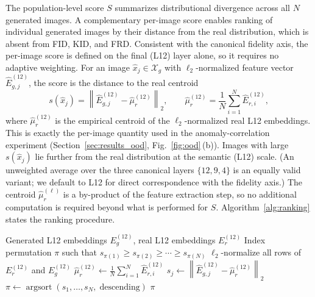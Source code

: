 \documentclass[lettersize,journal]{IEEEtran}
\begin{document}
The population-level score $S$ summarizes distributional divergence
across all $N$ generated images.
A complementary per-image score enables ranking of individual generated
images by their distance from the real distribution, which is absent from
FID, KID, and FRD.
Consistent with the canonical fidelity axis, the per-image score is defined on
the final (L12) layer alone, so it requires no adaptive weighting. For an image
$\hat{x}_j \in \mathcal{X}_g$ with $\ell_2$-normalized feature vector
$\hat{E}_{g,j}^{(12)}$, the score is the distance to the real centroid
\begin{equation}
\label{eq:perim}
s(\hat{x}_j)
=
\left\|
\hat{E}_{g,j}^{(12)} - \hat{\mu}_{r}^{(12)}
\right\|_2,
\qquad
\hat{\mu}_{r}^{(12)}
=
\frac{1}{N}
\sum_{i=1}^{N}
\hat{E}_{r,i}^{(12)},
\end{equation}
where $\hat{\mu}_{r}^{(12)}$ is the empirical centroid of the
$\ell_2$-normalized real L12 embeddings. This is exactly the per-image quantity
used in the anomaly-correlation experiment (Section~\ref{sec:results_ood},
Fig.~\ref{fig:ood}\,(b)). Images with large $s(\hat{x}_j)$ lie further from the
real distribution at the semantic (L12) scale. (An unweighted average over the
three canonical layers $\{12,9,4\}$ is an equally valid variant; we default to
L12 for direct correspondence with the fidelity axis.)
The centroid $\hat{\mu}_r^{(\ell)}$ is a by-product of the feature
extraction step, so no additional computation is required beyond what is
performed for $S$.
Algorithm~\ref{alg:ranking} states the ranking procedure.

\begin{algorithm}[t]
\caption{Per-image quality ranking}
\label{alg:ranking}
\begin{algorithmic}[1]
\Require Generated L12 embeddings $E_g^{(12)}$, real L12 embeddings $E_r^{(12)}$
\Ensure Index permutation $\pi$ such that
        $s_{\pi(1)} \geq s_{\pi(2)} \geq \cdots \geq s_{\pi(N)}$
\State $\ell_2$-normalize all rows of $E_r^{(12)}$ and $E_g^{(12)}$
\State $\hat{\mu}_r^{(12)} \leftarrow
       \frac{1}{N}\sum_{i=1}^{N} \hat{E}_{r,i}^{(12)}$
    \State $s_j \leftarrow
    \left\| \hat{E}_{g,j}^{(12)} - \hat{\mu}_r^{(12)} \right\|_2$
\EndFor
\State $\pi \leftarrow \operatorname{argsort}(s_1, \ldots, s_N,\;
       \text{descending})$
\State \Return $\pi$
\end{algorithmic}
\end{algorithm}
\end{document}
